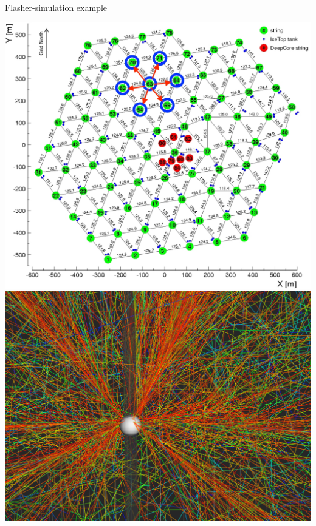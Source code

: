 
\begin{frame}{Flasher-simulation example}

  \centering
  \includegraphics[height=0.4\textheight]{img/flasher-scenario}\hspace{1.2cm}
  \includegraphics[height=0.4\textheight]{img/flasher-steamshovel-sending}


\end{frame}
